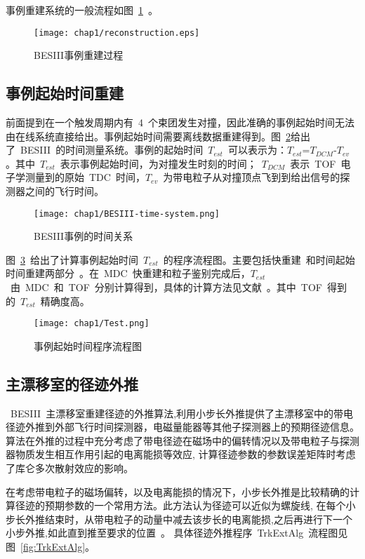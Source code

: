 事例重建系统的一般流程如图~\ref{fig:reconstruction}~。

\begin{figure}[!h]
  \centering
  \texttt{[image: chap1/reconstruction.eps]}
  \caption{BESIII事例重建过程}
  \label{fig:reconstruction}
\end{figure}

\subsection{事例起始时间重建}

前面提到在一个触发周期内有~4~个束团发生对撞，因此准确的事例起始时间无法由在线系统直接给出。事例起始时间需要离线数据重建得到。图~\ref{fig:BESIII-time-system}给出了~BESIII~的时间测量系统。事例的起始时间~$T_{est}$~可以表示为：$T_{est}$=$T_{DCM}$-$T_{ev}$。其中~$T_{est}$~表示事例起始时间，为对撞发生时刻的时间；~$T_{DCM}$~表示~TOF~电子学测量到的原始~TDC~时间，$T_{ev}$~为带电粒子从对撞顶点飞到到给出信号的探测器之间的飞行时间。
\begin{figure}[!h]
  \centering
  \texttt{[image: chap1/BESIII-time-system.png]}
  \caption{BESIII事例的时间关系}
  \label{fig:BESIII-time-system}
\end{figure}

图~\ref{fig:Test}~给出了计算事例起始时间~$T_{est}$~的程序流程图。主要包括快重建~\cite{zhangxm:2005}和时间起始时间重建两部分~\cite{max:2007}。在~MDC~快重建和粒子鉴别完成后，$T_{est}$~由~MDC~和~TOF~分别计算得到，具体的计算方法见文献~\cite{Maxiang:2008}。其中~TOF~得到的~$T_{est}$~精确度高。

\begin{figure}[!h]
  \centering
  \texttt{[image: chap1/Test.png]}
  \caption{事例起始时间程序流程图}
  \label{fig:Test}
\end{figure}
\subsection{主漂移室的径迹外推}

~BESIII~主漂移室重建径迹的外推算法,利用小步长外推提供了主漂移室中的带电径迹外推到外部飞行时间探测器，电磁量能器等其他子探测器上的预期径迹信息。算法在外推的过程中充分考虑了带电径迹在磁场中的偏转情况以及带电粒子与探测器物质发生相互作用引起的电离能损等效应, 计算径迹参数的参数误差矩阵时考虑了库仑多次散射效应的影响。

在考虑带电粒子的磁场偏转，以及电离能损的情况下，小步长外推是比较精确的计算径迹的预期参数的一个常用方法。此方法认为径迹可以近似为螺旋线, 在每个小步长外推结束时，从带电粒子的动量中减去该步长的电离能损,之后再进行下一个小步外推,如此直到推至要求的位置~\cite{wangll:2014}。
具体径迹外推程序~TrkExtAlg~流程图见图~\ref{fig:TrkExtAlg}。

